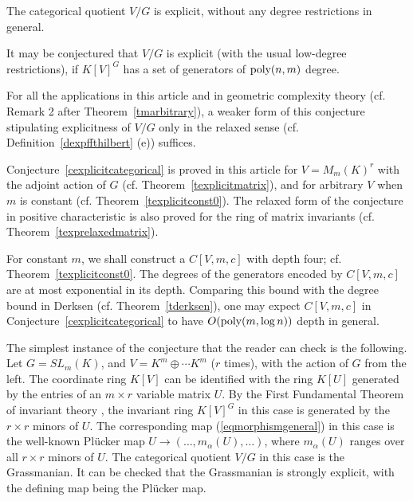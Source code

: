 \documentclass[11pt]{article}
\begin{document}
\begin{conj} \label{cexplicitcategorical}
The categorical quotient  $V/G$  is   explicit,
without any degree restrictions in general.
\end{conj}

It may be conjectured that $V/G$ is  explicit (with the usual low-degree 
restrictions), if $K[V]^G$ has a set of 
generators of ${\mbox {poly}}(n,m)$ degree.


For all the applications in this article and in geometric
complexity theory (cf. Remark 2 after Theorem~\ref{tmarbitrary}),
a weaker form of this conjecture stipulating  explicitness of
$V/G$  only in the relaxed sense (cf. Definition~\ref{dexpffthilbert} (e)) suffices.

Conjecture~\ref{cexplicitcategorical}
is proved  in this article for
$V=M_m(K)^r$ with the adjoint action of $G$ (cf. Theorem~\ref{texplicitmatrix}), and 
for arbitrary $V$ when $m$ is constant
(cf. Theorem~\ref{texplicitconst0}).  The relaxed form 
of the  conjecture in positive characteristic 
is also proved  for the ring of matrix invariants
(cf. Theorem~\ref{texprelaxedmatrix}).

For constant $m$, we shall construct  a $C[V,m,c]$ with
depth four; cf. Theorem~\ref{texplicitconst0}.
The degrees of the generators encoded by 
$C[V,m,c]$ are at most exponential in its depth.
Comparing this bound with the degree bound 
in Derksen \cite{derksen} (cf. Theorem~\ref{tderksen}), one may  expect $C[V,m,c]$ in 
Conjecture~\ref{cexplicitcategorical} to have  $O({\mbox {poly}}(m,\log n))$  depth in general.



The simplest instance of the conjecture that the reader can check  is the following. 
Let $G=SL_m(K)$, and $V=K^m \oplus \cdots K^m$ ($r$ times), with the action of $G$ from the left. 
The coordinate ring $K[V]$ can  be identified with  the ring $K[U]$ generated by the entries of an $m \times r$ variable matrix $U$.
By the First Fundamental Theorem  of invariant theory 
\cite{fultonrepr,weyl}, 
the invariant ring $K[V]^G$ in this case  is generated by the $r \times r$ minors of $U$. 
The corresponding  map (\ref{eqmorphismgeneral})  in this case is the well-known
 Pl\"ucker map \cite{fultonrepr}
$U \rightarrow (\ldots, m_\alpha(U), \ldots)$, where $m_\alpha(U)$ ranges over all $r \times r$
minors of $U$. 
The categorical quotient $V/G$ in this case 
is the  Grassmanian.  It can be checked that the Grassmanian is strongly explicit, with the defining map being
the Pl\"ucker map. 
\end{document}

